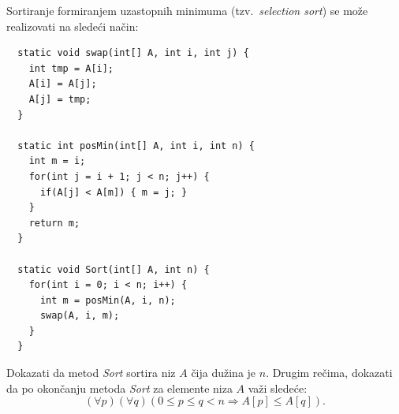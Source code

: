 \begin{EX}
  Sortiranje formiranjem uzastopnih minimuma (tzv.\ \emph{selection sort}) se mo\v ze realizovati na slede\'ci na\v cin:
{\small
\begin{verbatim}
  static void swap(int[] A, int i, int j) {
    int tmp = A[i];
    A[i] = A[j];
    A[j] = tmp;
  }
  
  static int posMin(int[] A, int i, int n) {
    int m = i;
    for(int j = i + 1; j < n; j++) {
      if(A[j] < A[m]) { m = j; }
    }
    return m;
  }
  
  static void Sort(int[] A, int n) {
    for(int i = 0; i < n; i++) {
      int m = posMin(A, i, n);
      swap(A, i, m);
    }
  }
\end{verbatim}
}
  \noindent
  Dokazati da metod \textit{Sort} sortira niz $A$ \v cija du\v zina je $n$. Drugim re\v cima, dokazati da
  po okon\v canju metoda \textit{Sort} za elemente niza $A$ va\v zi slede\'ce:
  $$
    (\forall p)(\forall q)(0 \le p \le q < n \Rightarrow A[p] \le A[q]).
  $$
\end{EX}
